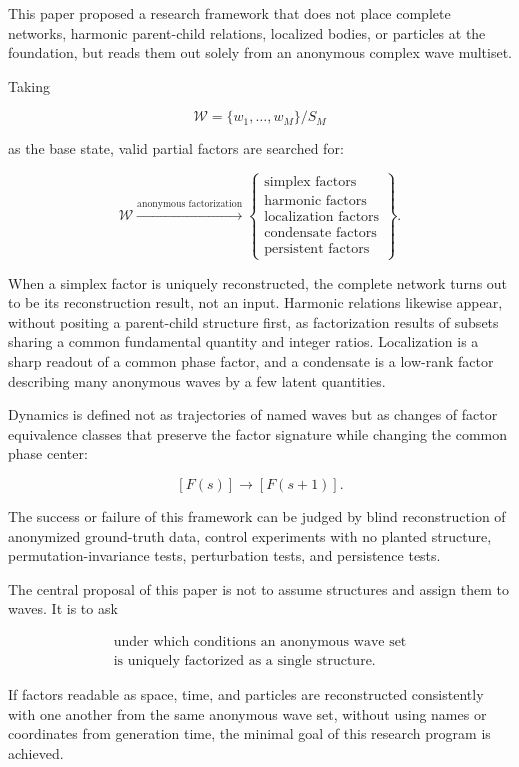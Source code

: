 \documentclass[
  a4paper,
]{article}
\begin{document}
This paper proposed a research framework that does not place complete
networks, harmonic parent-child relations, localized bodies, or
particles at the foundation, but reads them out solely from an anonymous
complex wave multiset.

Taking

\[
\mathcal W
=
\{w_1,\ldots,w_M\}/S_M
\]

as the base state, valid partial factors are searched for:

\[
\mathcal W
\xrightarrow{\text{anonymous factorization}}
\left\{
\begin{array}{l}
\text{simplex factors}\\
\text{harmonic factors}\\
\text{localization factors}\\
\text{condensate factors}\\
\text{persistent factors}
\end{array}
\right\}.
\]

When a simplex factor is uniquely reconstructed, the complete network
turns out to be its reconstruction result, not an input. Harmonic
relations likewise appear, without positing a parent-child structure
first, as factorization results of subsets sharing a common fundamental
quantity and integer ratios. Localization is a sharp readout of a common
phase factor, and a condensate is a low-rank factor describing many
anonymous waves by a few latent quantities.

Dynamics is defined not as trajectories of named waves but as changes of
factor equivalence classes that preserve the factor signature while
changing the common phase center:

\[
[F(s)]
\longrightarrow
[F(s+1)].
\]

The success or failure of this framework can be judged by blind
reconstruction of anonymized ground-truth data, control experiments with
no planted structure, permutation-invariance tests, perturbation tests,
and persistence tests.

The central proposal of this paper is not to assume structures and
assign them to waves. It is to ask

\[
\boxed{
\begin{array}{l}
\text{under which conditions an anonymous wave set}\\
\text{is uniquely factorized as a single structure.}
\end{array}
}
\]

If factors readable as space, time, and particles are reconstructed
consistently with one another from the same anonymous wave set, without
using names or coordinates from generation time, the minimal goal of
this research program is achieved.
\end{document}
